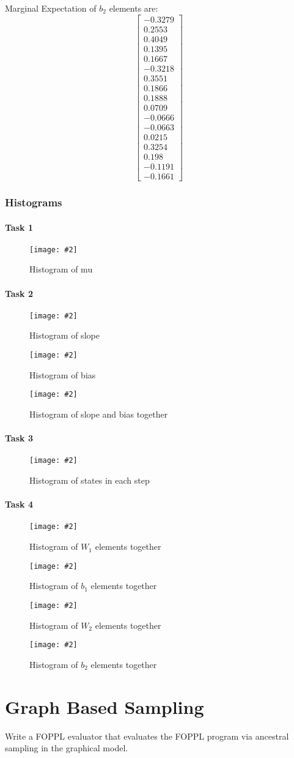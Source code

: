 \documentclass{article}
\def\blu#1{{\color{blu}#1}}
\newcommand{\centerfigcap}[3]{\begin{figure}[H]
\begin{center}\texttt{[image: \#2]} \caption{#3}\end{center}
\end{figure}}
\begin{document}
Marginal Expectation of $b_2$ elements are:
\[
\begin{bmatrix}
-0.3279\\
0.2553\\
0.4049\\
0.1395\\
0.1667\\
-0.3218\\
0.3551\\
0.1866\\
0.1888\\
0.0709\\
-0.0666\\
-0.0663\\
0.0215\\
0.3254\\
0.198\\
-0.1191\\
-0.1661
\end{bmatrix}
\]
\subsubsection{Histograms}
\paragraph{Task 1}
\centerfigcap{0.6}{../Results/eval_1}{Histogram of mu}
\paragraph{Task 2}
\centerfigcap{0.6}{../Results/eval_2_slope}{Histogram of slope}
\centerfigcap{0.6}{../Results/eval_2_bias}{Histogram of bias}
\centerfigcap{0.7}{../Results/eval_2_both}{Histogram of slope and bias together}
\paragraph{Task 3}
\centerfigcap{1}{../Results/eval_3}{Histogram of states in each step}
\paragraph{Task 4}
\centerfigcap{0.7}{../Results/eval_4_w1}{Histogram of $W_1$ elements together}
\centerfigcap{0.7}{../Results/eval_4_b1}{Histogram of $b_1$ elements together}
\centerfigcap{1}{../Results/eval_4_w2}{Histogram of $W_2$ elements together}
\centerfigcap{0.7}{../Results/eval_4_b2}{Histogram of $b_2$ elements together}
\pagebreak
\section{Graph Based Sampling}
\blu{Write a FOPPL evaluator that evaluates the FOPPL program via ancestral sampling in the graphical model.}
\end{document}
